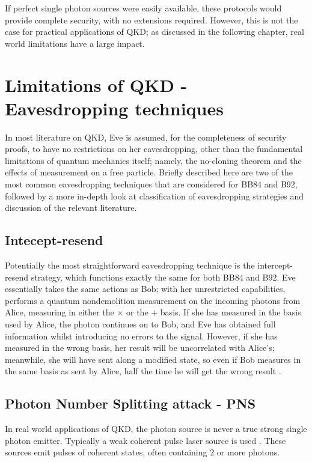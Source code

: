 \documentclass[paper=a4, fontsize=11pt]{scrartcl} %
\numberwithin{equation}{section} %
\numberwithin{figure}{section} %
\numberwithin{table}{section} %
\begin{document}
If perfect single photon sources were easily available,
these protocols would provide complete security, with no extensions required.
However, this is not the case for practical applications of QKD;
as discussed in the following chapter, real world limitations have a large impact.

\clearpage
\section{Limitations of QKD - Eavesdropping techniques}
In most literature on QKD, Eve is assumed, for the completeness of security proofs, to have no restrictions
on her eavesdropping, other than the fundamental limitations of quantum mechanics itself; namely, the
no-cloning theorem and the effects of measurement on a free particle. Briefly described here are two of the
most common eavesdropping techniques that are considered for BB84 and B92, followed by a more in-depth look
at classification of eavesdropping strategies and discussion of the relevant literature.

\subsection{Intecept-resend}
Potentially the most straightforward eavesdropping technique is the intercept-resend
strategy, which functions exactly the same for both BB84 and  B92.
Eve essentially takes the same actions as Bob; with her unrestricted capabilities, performs
a quantum nondemolition measurement on the incoming photons from Alice, measuring in either the $\times$
or the $+$ basis. If she has measured in the basis used by Alice, the photon continues on to Bob,
and Eve has obtained full information whilst introducing no errors to the signal. However, if she has measured
in the wrong basis, her result will be uncorrelated with Alice's; meanwhile, she will have sent along
a modified state, so even if Bob measures in the same basis as sent by Alice, half the time he will get the
wrong result \citep{reviewScariani}.


\subsection{Photon Number Splitting attack - PNS}
In real world applications of QKD, the photon source is never a true strong single photon emitter. Typically
a weak coherent pulse laser source is used \citep{satellites}.
These sources emit pulses of coherent states, often containing 2 or more photons.
\end{document}
